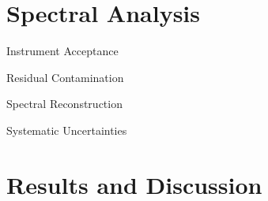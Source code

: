 \documentclass{article}
\begin{document}
\section{Spectral Analysis}
	\begin{myEnumerate}
		\item Instrument Acceptance
		\item Residual Contamination
		\item Spectral Reconstruction
		\item Systematic Uncertainties
	\end{myEnumerate}
\section{Results and Discussion}
\end{document}
